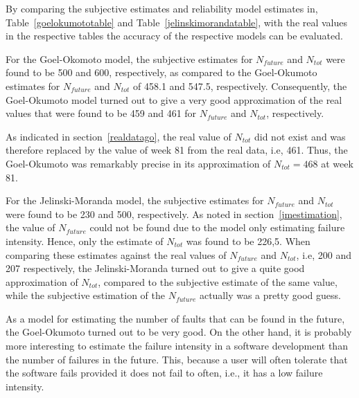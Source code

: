 By comparing the subjective estimates and reliability model estimates in, Table~\ref{goelokumototable} and Table~\ref{jelinskimorandatable}, with the real values in the respective tables the accuracy of the respective models can be evaluated. 

For the Goel-Okomoto model, the subjective estimates for $N_{future}$ and $N_{tot}$ were found to be 500 and 600, respectively, as compared to the Goel-Okumoto estimates for $N_{future}$ and $N_{tot}$ of 458.1 and 547.5, respectively. Consequently, the Goel-Okumoto model turned out to give a very good approximation of the real values that were found to be 459 and 461 for $N_{future}$ and $N_{tot}$, respectively. 

As indicated in section~\ref{realdatago}, the real value of $N_{tot}$ did not exist and was therefore replaced by the value of week 81 from the real data, i.e, 461. Thus, the Goel-Okumoto was remarkably precise in its approximation of $N_{tot}=468$ at week 81. 

For the Jelinski-Moranda model, the subjective estimates for $N_{future}$ and $N_{tot}$ were found to be 230 and 500, respectively. As noted in section~\ref{jmestimation}, the value of $N_{future}$ could not be found due to the model only estimating failure intensity. Hence, only the estimate of $N_{tot}$ was found to be 226,5. When comparing these estimates against the real values of $N_{future}$ and $N_{tot}$, i.e, 200 and 207 respectively, the Jelinski-Moranda turned out to give a quite good approximation of $N_{tot}$, compared to the subjective estimate of the same value, while the subjective estimation of the $N_{future}$ actually was a pretty good guess. 

As a model for estimating the number of faults that can be found in the future, the Goel-Okumoto turned out to be very good. On the other hand, it is probably more interesting to estimate the failure intensity in a software development than the number of failures in the future. This, because a user will often tolerate that the software fails provided it does not fail to often, i.e., it has a low failure intensity.